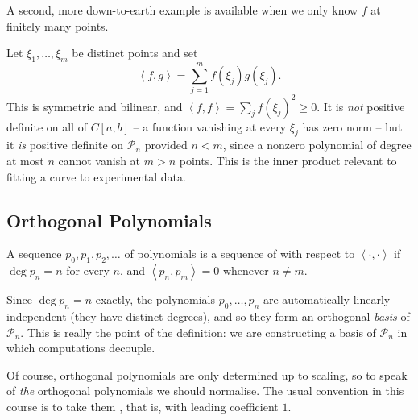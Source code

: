 \documentclass[a4paper]{scrartcl}
\newcommand{\ip}[2]{\left\langle #1, #2 \right\rangle}
\newcommand{\Pn}[1]{\mathcal{P}_{#1}}
\begin{document}
A second, more down-to-earth example is available when we only know $f$ at finitely many points.

\begin{example}
  Let $\xi_1, \dots, \xi_m$ be distinct points and set
  $$
  \ip{f}{g} = \sum_{j=1}^{m} f(\xi_j) g(\xi_j).
  $$
  This is symmetric and bilinear, and $\ip{f}{f} = \sum_j f(\xi_j)^2 \geq 0$. It is \emph{not} positive definite on all of $C[a,b]$ -- a function vanishing at every $\xi_j$ has zero norm -- but it \emph{is} positive definite on $\Pn{n}$ provided $n < m$, since a nonzero polynomial of degree at most $n$ cannot vanish at $m > n$ points. This is the inner product relevant to fitting a curve to experimental data.
\end{example}

\subsection{Orthogonal Polynomials}

\begin{definition}
  A sequence $p_0, p_1, p_2, \dots$ of polynomials is a sequence of  with respect to $\ip{\cdot}{\cdot}$ if $\deg p_n = n$ for every $n$, and $\ip{p_n}{p_m} = 0$ whenever $n \neq m$.
\end{definition}

Since $\deg p_n = n$ exactly, the polynomials $p_0, \dots, p_n$ are automatically linearly independent (they have distinct degrees), and so they form an orthogonal \emph{basis} of $\Pn{n}$. This is really the point of the definition: we are constructing a basis of $\Pn{n}$ in which computations decouple.

Of course, orthogonal polynomials are only determined up to scaling, so to speak of \emph{the} orthogonal polynomials we should normalise. The usual convention in this course is to take them , that is, with leading coefficient $1$.
\end{document}
